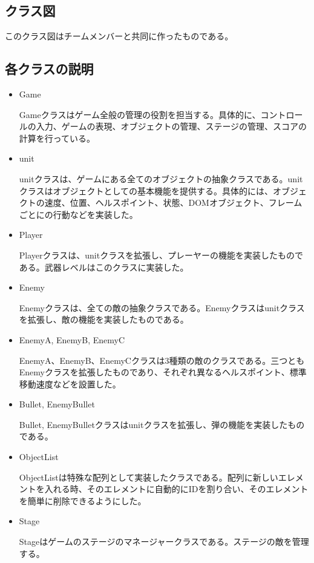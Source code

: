 \subsection{クラス図}
	このクラス図はチームメンバーと共同に作ったものである。
	
\subsection{各クラスの説明}
	\begin{itemize}
		\item Game
		
		Gameクラスはゲーム全般の管理の役割を担当する。具体的に、コントロールの入力、ゲームの表現、オブジェクトの管理、ステージの管理、スコアの計算を行っている。
		\item unit
		
		unitクラスは、ゲームにある全てのオブジェクトの抽象クラスである。unitクラスはオブジェクトとしての基本機能を提供する。具体的には、オブジェクトの速度、位置、ヘルスポイント、状態、DOMオブジェクト、フレームごとにの行動などを実装した。
		\item Player
		
		Playerクラスは、unitクラスを拡張し、プレーヤーの機能を実装したものである。武器レベルはこのクラスに実装した。
		\item Enemy
		
		Enemyクラスは、全ての敵の抽象クラスである。Enemyクラスはunitクラスを拡張し、敵の機能を実装したものである。
		
		\item EnemyA, EnemyB, EnemyC
		
		EnemyA、EnemyB、EnemyCクラスは3種類の敵のクラスである。三つともEnemyクラスを拡張したものであり、それぞれ異なるヘルスポイント、標準移動速度などを設置した。
		
		\item Bullet, EnemyBullet
		
		Bullet, EnemyBulletクラスはunitクラスを拡張し、弾の機能を実装したものである。
		
		\item ObjectList
		
		ObjectListは特殊な配列として実装したクラスである。配列に新しいエレメントを入れる時、そのエレメントに自動的にIDを割り合い、そのエレメントを簡単に削除できるようにした。
		
		\item Stage
		
		Stageはゲームのステージのマネージャークラスである。ステージの敵を管理する。
	\end{itemize}
